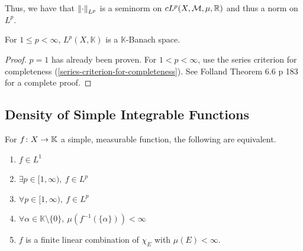 \documentclass[11pt,leqno,oneside]{amsbook}
\numberwithin{thm}{section}
\newcommand{\M}{\mathcal{M}} %
\newcommand{\K}{\mathbb{K}} %
\begin{document}
Thus, we have that \(\left\lVert\cdot\right\rVert_{L^p}\) is a seminorm on
\(cL^p(X,\M,\mu,\R)\) and thus a norm on \(L^p\).
\begin{thm}
  For \(1 \leq p < \infty\), \(L^p(X,\K)\) is a \(\K\)-Banach space.
\end{thm}
\begin{proof}
  \(p=1\) has already been proven. For \(1 < p < \infty\), use
  the series criterion for completeness
  (\ref{series-criterion-for-completeness}). See Folland Theorem 6.6 p
  183 for a complete proof.
\end{proof}
\subsection{Density of Simple Integrable Functions}
\begin{thm}
  For \(f \from X \to \K\) a simple, measurable function, the
  following are equivalent.
  \begin{enumerate}
  \item \(f \in L^1\)
  \item \(\exists p \in [1,\infty), \ f \in L^p\)
  \item \(\forall p \in [1,\infty), \ f \in L^p\)
  \item \(\forall \alpha \in \K \setminus \{0\}, \
    \mu(f^{-1}(\{\alpha\})) < \infty\)
  \item \(f\) is a finite linear combination of \(\chi_E\) with
    \(\mu(E) < \infty\).
  \end{enumerate}
\end{thm}
\end{document}
